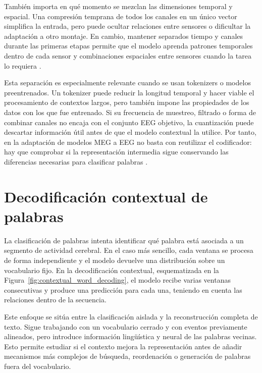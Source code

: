 También importa en qué momento se mezclan las dimensiones temporal y espacial. Una compresión temprana de todos los canales en un único vector simplifica la entrada, pero puede ocultar relaciones entre sensores o dificultar la adaptación a otro montaje. En cambio, mantener separados tiempo y canales durante las primeras etapas permite que el modelo aprenda patrones temporales dentro de cada sensor y combinaciones espaciales entre sensores cuando la tarea lo requiera \cite{roy2019eegdeep,jayalath2026megxl}.

Esta separación es especialmente relevante cuando se usan tokenizers o modelos preentrenados. Un tokenizer puede reducir la longitud temporal y hacer viable el procesamiento de contextos largos, pero también impone las propiedades de los datos con los que fue entrenado. Si su frecuencia de muestreo, filtrado o forma de combinar canales no encaja con el conjunto EEG objetivo, la cuantización puede descartar información útil antes de que el modelo contextual la utilice. Por tanto, en la adaptación de modelos MEG a EEG no basta con reutilizar el codificador: hay que comprobar si la representación intermedia sigue conservando las diferencias necesarias para clasificar palabras \cite{vandenOord2017vqvae,zeghidour2022soundstream,avramidis2025biocodec,jayalath2026megxl}.

\section{Decodificación contextual de palabras}

La clasificación de palabras intenta identificar qué palabra está asociada a un segmento de actividad cerebral. En el caso más sencillo, cada ventana se procesa de forma independiente y el modelo devuelve una distribución sobre un vocabulario fijo. En la decodificación contextual, esquematizada en la Figura~\ref{fig:contextual_word_decoding}, el modelo recibe varias ventanas consecutivas y produce una predicción para cada una, teniendo en cuenta las relaciones dentro de la secuencia.

Este enfoque se sitúa entre la clasificación aislada y la reconstrucción completa de texto. Sigue trabajando con un vocabulario cerrado y con eventos previamente alineados, pero introduce información lingüística y neural de las palabras vecinas. Esto permite estudiar si el contexto mejora la representación antes de añadir mecanismos más complejos de búsqueda, reordenación o generación de palabras fuera del vocabulario.

